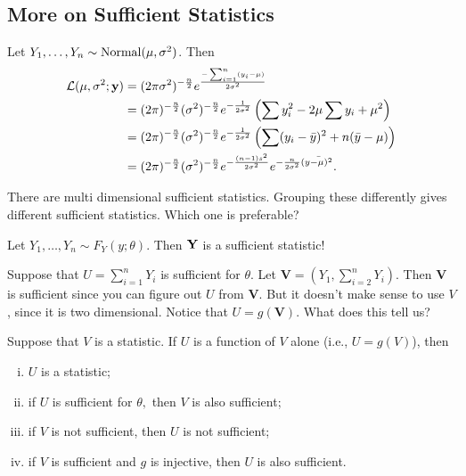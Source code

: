
\subsection{More on Sufficient Statistics}

\begin{eg}
Let $Y_1,\ldots,Y_n\sim \operatorname*{Normal}(\mu,\sigma^2)$. Then
\begin{align*}
    \mathcal L(\mu,\sigma^2;\mathbf y)&=(2\pi\sigma^2)^{-\frac{n}{2}}e^{\frac{-\sum^n_{i=1}(y_i-\mu)}{2\sigma^2}} \\
    &=(2\pi)^{-\frac{n}{2}}(\sigma^2)^{-\frac{n}{2}}e^{-\frac{1}{2\sigma^2}}\left(\sum y_i^2-2\mu\sum y_i +\mu^2\right) \\
    &=(2\pi)^{-\frac{n}{2}}(\sigma^2)^{-\frac{n}{2}}e^{-\frac{1}{2\sigma^2}}\left(\sum (y_i-\bar y)^2+n(\bar y -\mu) \right) \\
	&=(2\pi)^{-\frac{n}{2}}(\sigma^2)^{-\frac{n}{2}}e^{-\frac{(n-1)s^2}{2\sigma^2}}e^{-\frac{n}{2\sigma^2}(\bar{ y-\mu)^2}}.
\end{align*}
\end{eg}

There are multi dimensional sufficient statistics. Grouping these differently gives different sufficient statistics. Which one is preferable?

Let $Y_1,\ldots,Y_n\sim F_Y(y;\theta).$ Then $\mathbf Y$ is a sufficient statistic! 

Suppose that $U=\sum^n_{i=1}Y_i$ is sufficient for $\theta.$ Let $\mathbf V=\left(Y_1,\sum^n_{i=2}Y_i\right)$. Then $\mathbf V$ is sufficient since you can figure out $U$ from $\mathbf V.$ But it doesn't make sense to use $V$, since it is two dimensional. Notice that $U=g(\mathbf V).$ What does this tell us?


Suppose that $V$ is a statistic. If $U$ is a function of $V$ alone (i.e., $U=g(V)$), then
\begin{prop}
\begin{enumerate}[i.]
    \item $U$ is a statistic;
    \item if $U$ is sufficient for $\theta,$ then $V$ is also sufficient;
    \item if $V$ is not sufficient, then $U$ is not sufficient;
    \item if $V$ is sufficient and $g$ is injective, then $U$ is also sufficient.
\end{enumerate}
\end{prop}

